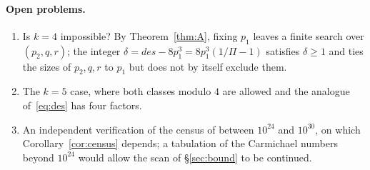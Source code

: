 \documentclass[11pt]{amsart}
\theoremstyle{definition}
\theoremstyle{remark}
\begin{document}
\paragraph{Open problems.}
\begin{enumerate}[leftmargin=2em]
\item Is $k=4$ impossible? By Theorem~\ref{thm:A}, fixing $p_1$ leaves a finite search over $(p_2,q,r)$; the integer $\delta=des-8p_1^3=8p_1^3(1/\Pi-1)$ satisfies $\delta\ge1$ \cite[proof of Thm.~2]{MD15} and ties the sizes of $p_2,q,r$ to $p_1$ but does not by itself exclude them.
\item The $k=5$ case, where both classes modulo $4$ are allowed and the analogue of~\eqref{eq:des} has four factors.
\item An independent verification of the census of \cite{Pud30} between $10^{24}$ and $10^{30}$, on which Corollary~\ref{cor:census} depends; a tabulation of the Carmichael numbers beyond $10^{24}$ would allow the scan of \S\ref{sec:bound} to be continued.
\end{enumerate}
\end{document}
